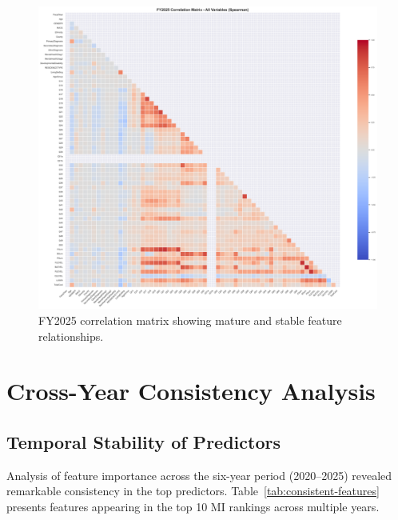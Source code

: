 \begin{figure}[htbp]
    \centering
    \includegraphics[width=\textwidth]{figures/fy2025_correlation_matrix_-_all_variables_(spearman).png}
    \caption{FY2025 correlation matrix showing mature and stable feature relationships.}
    \label{fig:fy2025-corr-all}
\end{figure}

\section{Cross-Year Consistency Analysis}
\label{sec:cross-year-analysis}

\subsection{Temporal Stability of Predictors}
\label{subsec:temporal-stability}

Analysis of feature importance across the six-year period (2020--2025) revealed remarkable consistency in the top predictors. Table~\ref{tab:consistent-features} presents features appearing in the top 10 MI rankings across multiple years.



